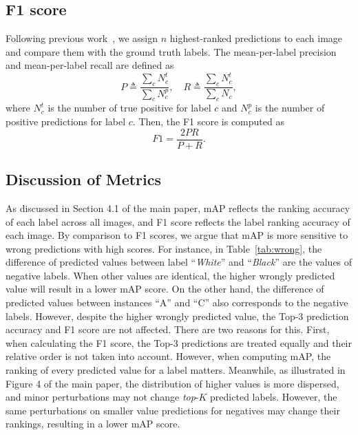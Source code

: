 \documentclass[letterpaper]{article} %
\begin{document}
\subsection{F1 score}
Following previous work~\cite{gong2014deep}, we assign $n$ highest-ranked predictions to each image and compare them with the ground truth labels. 
The mean-per-label precision and mean-per-label recall are defined as 
\begin{equation}
P \triangleq \frac{\sum_{c} N_{c}^{t}}{\sum_{c} N_{c}^{p}}, \quad R \triangleq \frac{\sum_{c} N_{c}^{t}}{\sum_{c} N_{c}},
\end{equation}
where $N_{c}^{t}$ is the number of true positive for label $c$ and $N_{c}^{p}$ is the number of positive predictions for label $c$. Then, the F1 score is computed as
\begin{equation}
F 1=\frac{2 P R}{P+R}.
\end{equation}


\subsection{Discussion of Metrics}
As discussed in Section 4.1 of the main paper, mAP reflects the ranking accuracy of each label across all images, and F1 score reflects the label ranking accuracy of each image.
By comparison to F1 scores, we argue that mAP is more sensitive to wrong predictions with high scores.
For instance, in Table~\ref{tab:wrong}, the difference of predicted values between label ``\textit{White}'' and ``\textit{Black}'' are the values of negative labels.
When other values are identical, the higher wrongly predicted value will result in a lower mAP score.
On the other hand, the difference of predicted values between instances ``A'' and ``C'' also corresponds to the negative labels. 
However, despite the higher wrongly predicted value, the Top-3 prediction accuracy and F1 score are not affected.
There are two reasons for this.
First, when calculating the F1 score, the Top-3 predictions are treated equally and their relative order is not taken into account.
However, when computing mAP, the ranking of every predicted value for a label matters.
Meanwhile, as illustrated in Figure 4 of the main paper, the distribution of higher values is more dispersed, and minor perturbations may not change \textit{top}-$K$ predicted labels.
However, the same perturbations on smaller value predictions for negatives may change their rankings, resulting in a lower mAP score. 
\end{document}
